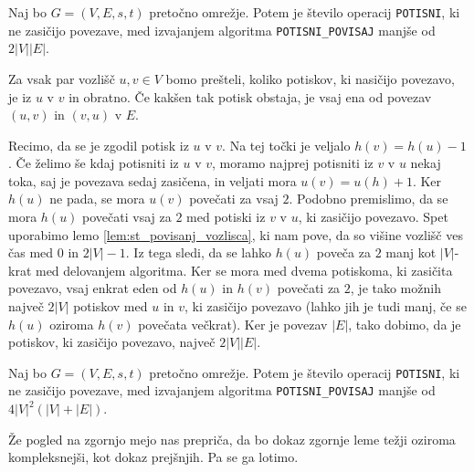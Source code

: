 \documentclass[mat1]{fmfdelo}
\begin{document}
\begin{lema}\label{lem:om_st_op_potisni_nas}
Naj bo $G=(V,E,s,t)$ pretočno omrežje. Potem je število operacij \texttt{POTISNI}, ki ne zasičijo povezave, med izvajanjem algoritma \texttt{POTISNI\_POVISAJ} manjše od $2|V||E|$.
\end{lema}

\begin{dokaz}
Za vsak par vozlišč $u,v \in V$ bomo prešteli, koliko potiskov, ki nasičijo povezavo, je iz $u$ v $v$ in obratno. Če kakšen tak potisk obstaja, je vsaj ena od povezav $(u,v)$ in $(v,u)$ v $E$.

Recimo, da se je zgodil potisk iz $u$ v $v$. Na tej točki je veljalo $h(v) = h(u) - 1$. Če želimo še kdaj potisniti iz $u$ v $v$, moramo najprej potisniti iz $v$ v $u$ nekaj toka, saj je povezava sedaj zasičena, in veljati mora $u(v) = u(h) + 1$. Ker $h(u)$ ne pada, se mora $u(v)$ povečati za vsaj $2$. Podobno premislimo, da se mora $h(u)$ povečati vsaj za $2$ med potiski iz $v$ v $u$, ki zasičijo povezavo. Spet uporabimo lemo \ref{lem:st_povisanj_vozlisca}, ki nam pove, da so višine vozlišč ves čas med $0$ in $2|V|-1$. Iz tega sledi, da se lahko $h(u)$ poveča za $2$ manj kot $|V|$-krat med delovanjem algoritma. Ker se mora med dvema potiskoma, ki zasičita povezavo, vsaj enkrat eden od $h(u)$ in $h(v)$ povečati za $2$, je tako možnih največ $2|V|$ potiskov med $u$ in $v$, ki zasičijo povezavo (lahko jih je tudi manj, če se $h(u)$ oziroma $h(v)$ povečata večkrat). Ker je povezav $|E|$, tako dobimo, da je potiskov, ki zasičijo povezavo, največ $2|V||E|$.
\end{dokaz}

\begin{lema} \label{lem:om_st_op_potisni_nezas}
Naj bo $G=(V,E,s,t)$ pretočno omrežje. Potem je število operacij \texttt{POTISNI}, ki ne zasičijo povezave, med izvajanjem algoritma \texttt{POTISNI\_POVISAJ} manjše od $4|V|^2 (|V| + |E|)$.
\end{lema}

Že pogled na zgornjo mejo nas prepriča, da bo dokaz zgornje leme težji oziroma kompleksnejši, kot dokaz prejšnjih. Pa se ga lotimo.
\end{document}
